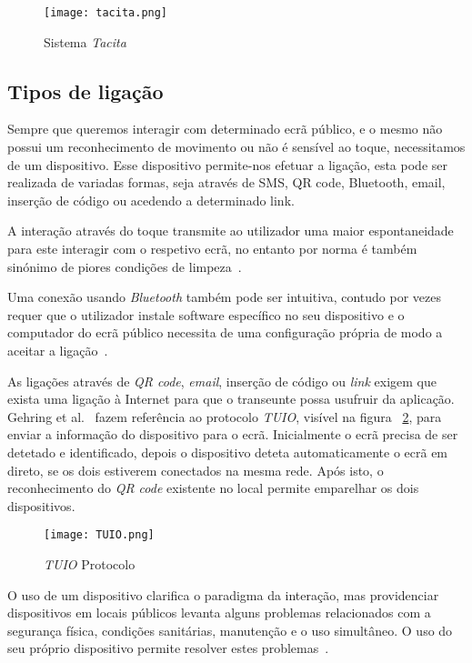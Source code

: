 \begin{figure}[ht]
\centering
\texttt{[image: tacita.png]}
\caption[Sistema \textit{Tacita}] {Sistema \textit{Tacita} ~\cite{Davies2012b}}
\label{fig:tacita}
\end{figure}

\subsection{Tipos de ligação}

Sempre que queremos interagir com determinado ecrã público, e o mesmo não possui um reconhecimento de movimento ou não é sensível ao toque, necessitamos de um dispositivo. Esse dispositivo permite-nos efetuar a ligação, esta pode ser realizada de variadas formas, seja através de SMS, QR code, Bluetooth, email, inserção de código ou acedendo a determinado link.

A interação através do toque transmite ao utilizador uma maior espontaneidade para este interagir com o respetivo ecrã, no entanto por norma é também sinónimo de piores condições de limpeza~\cite{Ballagas}.

Uma conexão usando \textit{Bluetooth} também pode ser intuitiva, contudo por vezes requer que o utilizador instale software específico no seu dispositivo e o computador do ecrã público necessita de uma configuração própria de modo a aceitar a ligação~\cite{Ballagas}.

As ligações através de \textit{QR code}, \textit{email}, inserção de código ou \textit{link} exigem que exista uma ligação à Internet para que o transeunte possa usufruir da aplicação. 
Gehring et al.~\cite{Gehring} fazem referência ao protocolo \textit{TUIO}, visível na figura ~\ref{fig:TUIO}, para enviar a informação do dispositivo para o ecrã. Inicialmente o ecrã precisa de ser detetado e identificado, depois o dispositivo deteta automaticamente o ecrã em direto, se os dois estiverem conectados na mesma rede. Após isto, o reconhecimento do \textit{QR code} existente no local permite emparelhar os dois dispositivos.

\begin{figure}[ht]
\centering
\texttt{[image: TUIO.png]}
\caption[\textit{TUIO} Protocolo] {\textit{TUIO} Protocolo}
\label{fig:TUIO}
\end{figure}


O uso de um dispositivo clarifica o paradigma da interação, mas providenciar dispositivos em locais públicos levanta alguns problemas relacionados com a segurança física, condições sanitárias, manutenção e o uso simultâneo. O uso do seu próprio dispositivo permite resolver estes problemas~\cite{Ballagas}.

